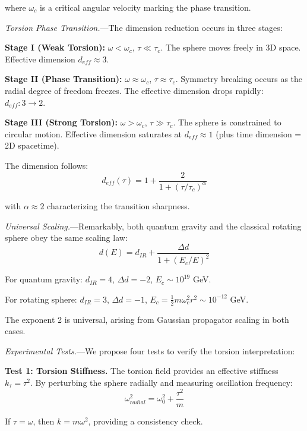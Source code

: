 \documentclass[aps,prl,twocolumn,superscriptaddress,floatfix]{revtex4-2}
\begin{document}
where $\omega_c$ is a critical angular velocity marking the phase transition.

\textit{Torsion Phase Transition.}---The dimension reduction occurs in three stages:

\textbf{Stage I (Weak Torsion):} $\omega < \omega_c$, $\tau \ll \tau_c$. The sphere moves freely in 3D space. Effective dimension $d_{eff} \approx 3$.

\textbf{Stage II (Phase Transition):} $\omega \approx \omega_c$, $\tau \approx \tau_c$. Symmetry breaking occurs as the radial degree of freedom freezes. The effective dimension drops rapidly: $d_{eff}: 3 \to 2$.

\textbf{Stage III (Strong Torsion):} $\omega > \omega_c$, $\tau \gg \tau_c$. The sphere is constrained to circular motion. Effective dimension saturates at $d_{eff} \approx 1$ (plus time dimension = 2D spacetime).

The dimension follows:
\begin{equation}
    d_{eff}(\tau) = 1 + \frac{2}{1+(\tau/\tau_c)^\alpha}
\end{equation}

with $\alpha \approx 2$ characterizing the transition sharpness.

\textit{Universal Scaling.}---Remarkably, both quantum gravity and the classical rotating sphere obey the same scaling law:
\begin{equation}
    d(E) = d_{IR} + \frac{\Delta d}{1+(E_c/E)^2}
\end{equation}

For quantum gravity: $d_{IR}=4$, $\Delta d=-2$, $E_c \sim 10^{19}$ GeV.

For rotating sphere: $d_{IR}=3$, $\Delta d=-1$, $E_c = \frac{1}{2}m\omega_c^2 r^2 \sim 10^{-12}$ GeV.

The exponent 2 is universal, arising from Gaussian propagator scaling in both cases.

\textit{Experimental Tests.}---We propose four tests to verify the torsion interpretation:

\textbf{Test 1: Torsion Stiffness.} The torsion field provides an effective stiffness $k_\tau = \tau^2$. By perturbing the sphere radially and measuring oscillation frequency:
\begin{equation}
    \omega_{radial}^2 = \omega_0^2 + \frac{\tau^2}{m}
\end{equation}

If $\tau = \omega$, then $k = m\omega^2$, providing a consistency check.
\end{document}
